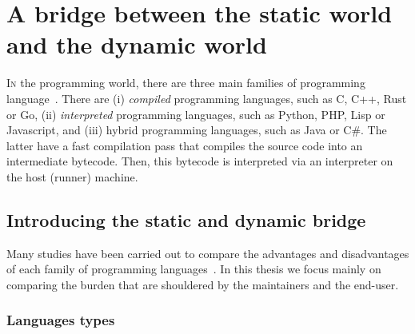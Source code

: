 \chapter{A bridge between the static world and the dynamic world}
\label{chap:static_dynamic_bridge}

\lettrine[lines=2]{I}{n} the programming world, there are three main families of programming
language~\parencite{prechelt.2000.comparison}. There are (i) \emph{compiled} programming languages, such as C, C++, Rust
or Go, (ii) \emph{interpreted} programming languages, such as Python, PHP, Lisp or Javascript, and (iii) hybrid
programming languages, such as Java or C\#. The latter have a fast compilation pass that compiles the source code into
an intermediate bytecode. Then, this bytecode is interpreted via an interpreter on the host (runner) machine.


\section{Introducing the static and dynamic bridge}

Many studies have been carried out to compare the advantages and disadvantages of each family of programming
languages~\parencite{boehm.1984.economics}. In this thesis we focus mainly on comparing the burden that are shouldered
by the maintainers and the end-user.


\subsection{Languages types}


